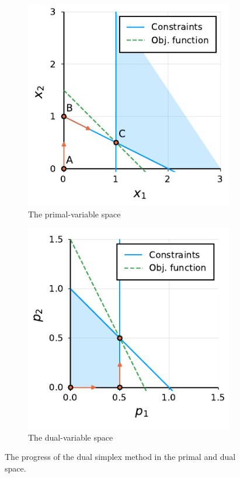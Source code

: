 \begin{figure}[h]
	\centering
	\begin{subfigure}{0.45\textwidth}
		\centering
		\includegraphics{chapters/chapter_5/figures/primal_plot}
		\caption{The primal-variable space}\label{p1c5:fig:ex1_P}
	\end{subfigure}
	\begin{subfigure}{0.45\textwidth}
		\centering
		\includegraphics{chapters/chapter_5/figures/dual_plot}
		\caption{The dual-variable space}\label{p1c5:fig:ex1_D}
	\end{subfigure}
	\caption{The progress of the dual simplex method in the primal and dual space.}	\label{p1c5:fig:ex1}
\end{figure}

